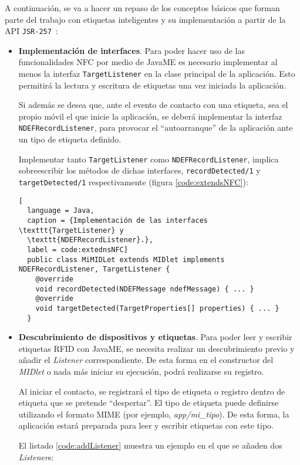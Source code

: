 A continuación, se va a hacer un repaso de los conceptos básicos que forman
parte del trabajo con etiquetas inteligentes y su implementación a partir
de la \acs{API} \texttt{\acs{JSR}-257}~\cite{bib:jfontecha}:
\begin{itemize}
\item \textbf{Implementación de interfaces}. Para poder hacer uso de las 
funcionalidades \acs{NFC} por medio de \acs{JavaME}
es necesario implementar al menos la interfaz \texttt{TargetListener} en la
clase principal de la aplicación. Esto permitirá la lectura y escritura de
etiquetas una vez iniciada la aplicación.

Si además se desea que, ante el evento de contacto con una etiqueta, sea el 
propio móvil el que inicie la aplicación, se deberá implementar la interfaz
\texttt{NDEFRecordListener}, para provocar el ``autoarranque'' de la aplicación
ante un tipo de etiqueta definido.

Implementar tanto \texttt{TargetListener} como \texttt{NDEFRecordListener},
implica sobreescribir los métodos de dichas interfaces,
\texttt{recordDetected/1} y \texttt{targetDetected/1} respectivamente
(figura \ref{code:extendsNFC}):

\begin{lstlisting}[
  language = Java,
  caption = {Implementación de las interfaces \texttt{TargetListener} y
  \texttt{NDEFRecordListener}.},
  label = code:extednsNFC]
  public class MiMIDLet extends MIDlet implements NDEFRecordListener, TargetListener {
    @override
    void recordDetected(NDEFMessage ndefMessage) { ... }
    @override
    void targetDetected(TargetProperties[] properties) { ... }
  }
\end{lstlisting}

\item \textbf{Descubrimiento de dispositivos y etiquetas}. Para poder leer y 
escribir etiquetas \acs{RFID} con \acs{JavaME}, se necesita realizar un 
descubrimiento previo y añadir el \emph{Listener} correspondiente. De esta 
forma en el constructor del \emph{MIDlet} o nada más iniciar su ejecución, 
podrá realizarse su registro.

Al iniciar el contacto, se registrará el tipo de etiqueta o registro dentro de 
etiqueta que se pretende ``despertar''. El tipo de etiqueta puede
definirse utilizando el formato \acs{MIME} (por ejemplo, \emph{app/mi\_tipo}).
De esta forma, la aplicación estará preparada para leer y escribir etiquetas
con este tipo.

El listado \ref{code:addListener} muestra un ejemplo en el que se añaden
dos \emph{Listener}s:


\end{itemize}
